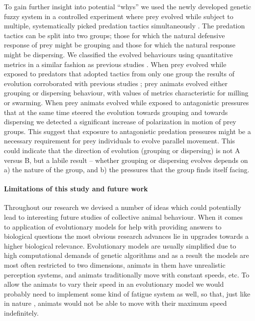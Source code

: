 To gain further insight into potential ``whys'' we used the newly developed genetic fuzzy system in a controlled experiment where prey evolved while subject to multiple, systematically picked predation tactics simultaneously \cite{demsar2016balanced}. The predation tactics can be split into two groups; those for which the natural defensive response of prey might be grouping and those for which the natural response might be dispersing. We classified the evolved behaviours using quantitative metrics in a similar fashion as previous studies \cite{couzin2002collective,vicsek2012collective,tunstrom2013collective}. When prey evolved while exposed to predators that adopted tactics from only one group the results of evolution corroborated with previous studies \cite{biswas2014causes,olson2013predator,olson2016evolution,wood2007evolving}; prey animats evolved either grouping or dispersing behaviour, with values of metrics characteristic for milling or swarming. When prey animats evolved while exposed to antagonistic pressures that at the same time steered the evolution towards grouping and towards dispersing we detected a significant increase of polarization in motion of prey groups. This suggest that exposure to antagonistic predation pressures might be a necessary requirement for prey individuals to evolve parallel movement. This could indicate that the direction of evolution (grouping or dispersing) is not A versus B, but a labile result -- whether grouping or dispersing evolves depends on a) the nature of the group, and b) the pressures that the group finds itself facing.

\paragraph{Limitations of this study and future work} Throughout our research we devised a number of ideas which could potentially lead to interesting future studies of collective animal behaviour. When it comes to application of evolutionary models for help with providing answers to biological questions the most obvious research advances lie in upgrades towards a higher biological relevance. Evolutionary models are usually simplified due to high computational demands of genetic algorithms and as a result the models are most often restricted to two dimensions, animats in them have unrealistic perception systems, and animats traditionally move with constant speeds, etc. To allow the animats to vary their speed in an evolutionary model we would probably need to implement some kind of fatigue system as well, so that, just like in nature \cite{norin2016measurement,roche2013finding}, animats would not be able to move with their maximum speed indefinitely.

